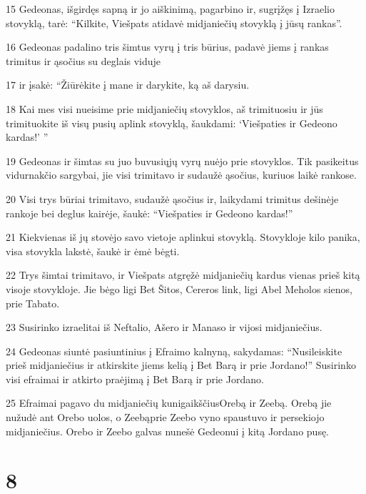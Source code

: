 \par 15 Gedeonas, išgirdęs sapną ir jo aiškinimą, pagarbino ir, sugrįžęs į Izraelio stovyklą, tarė: “Kilkite, Viešpats atidavė midjaniečių stovyklą į jūsų rankas”. 
\par 16 Gedeonas padalino tris šimtus vyrų į tris būrius, padavė jiems į rankas trimitus ir ąsočius su deglais viduje 
\par 17 ir įsakė: “Žiūrėkite į mane ir darykite, ką aš darysiu. 
\par 18 Kai mes visi nueisime prie midjaniečių stovyklos, aš trimituosiu ir jūs trimituokite iš visų pusių aplink stovyklą, šaukdami: ‘Viešpaties ir Gedeono kardas!’ ” 
\par 19 Gedeonas ir šimtas su juo buvusiųjų vyrų nuėjo prie stovyklos. Tik pasikeitus vidurnakčio sargybai, jie visi trimitavo ir sudaužė ąsočius, kuriuos laikė rankose. 
\par 20 Visi trys būriai trimitavo, sudaužė ąsočius ir, laikydami trimitus dešinėje rankoje bei deglus kairėje, šaukė: “Viešpaties ir Gedeono kardas!” 
\par 21 Kiekvienas iš jų stovėjo savo vietoje aplinkui stovyklą. Stovykloje kilo panika, visa stovykla lakstė, šaukė ir ėmė bėgti. 
\par 22 Trys šimtai trimitavo, ir Viešpats atgręžė midjaniečių kardus vienas prieš kitą visoje stovykloje. Jie bėgo ligi Bet Šitos, Cereros link, ligi Abel Meholos sienos, prie Tabato. 
\par 23 Susirinko izraelitai iš Neftalio, Ašero ir Manaso ir vijosi midjaniečius. 
\par 24 Gedeonas siuntė pasiuntinius į Efraimo kalnyną, sakydamas: “Nusileiskite prieš midjaniečius ir atkirskite jiems kelią į Bet Barą ir prie Jordano!” Susirinko visi efraimai ir atkirto praėjimą į Bet Barą ir prie Jordano. 
\par 25 Efraimai pagavo du midjaniečių kunigaikščius­Orebą ir Zeebą. Orebą jie nužudė ant Orebo uolos, o Zeebą­prie Zeebo vyno spaustuvo ir persekiojo midjaniečius. Orebo ir Zeebo galvas nunešė Gedeonui į kitą Jordano pusę.



\chapter{8}


